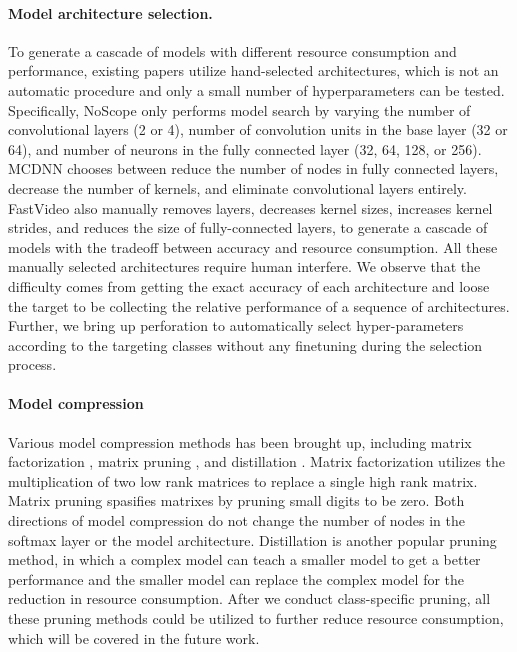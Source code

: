 \documentclass[pageno]{jpaper}
\begin{document}
\paragraph{Model architecture selection.}
To generate a cascade of models with different resource consumption and performance, existing papers utilize hand-selected architectures, which is not an automatic procedure and only a small number of hyperparameters can be tested. Specifically, NoScope \cite{kang2017noscope} only performs model search by varying the number of convolutional layers (2 or 4), number of convolution units in the base layer (32 or 64), and number of neurons in the fully connected layer (32, 64, 128, or 256). MCDNN \cite{han2016mcdnn} chooses between reduce the number of nodes in fully connected layers, decrease the number of kernels, and eliminate convolutional layers entirely. FastVideo \cite{shen2016fast} also manually removes layers, decreases kernel sizes, increases kernel strides, and reduces the size of fully-connected layers, to generate a cascade of models with the tradeoff between accuracy and resource consumption. All these manually selected architectures require human interfere. We observe that the difficulty comes from getting the exact accuracy of each architecture and loose the target to be collecting the relative performance of a sequence of architectures. Further, we bring up perforation to automatically select hyper-parameters according to the targeting classes without any finetuning during the selection process.


\paragraph{Model compression}
Various model compression methods has been brought up, including matrix factorization \cite{jaderberg2014speeding, kim2015compression, romero2014fitnets, xue2014singular}, matrix pruning \cite{chen2015compressing, han2015learning}, and distillation \cite{hinton2015distilling, ba2014deep, dauphin2013big, chen2017learning, lopez2015unifying, kim2015compression,bucilu2006model}. Matrix factorization utilizes the multiplication of two low rank matrices to replace a single high rank matrix. Matrix pruning spasifies matrixes by pruning small digits to be zero. Both directions of model compression do not change the number of nodes in the softmax layer or the model architecture. Distillation is another popular pruning method, in which a complex model can teach a smaller model to get a better performance and the smaller model can replace the complex model for the reduction in resource consumption. After we conduct class-specific pruning, all these pruning methods could be utilized to further reduce resource consumption, which will be covered in the future work.
\end{document}
